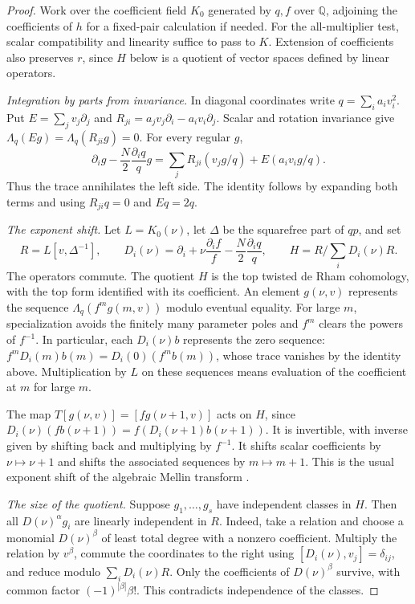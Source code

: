 \documentclass[11pt]{article}
\newcommand{\Lq}{\Lambda_q}
\begin{document}
\begin{proof}
Work over the coefficient field \(K_0\) generated by \(q,f\) over
\(\mathbb Q\), adjoining the coefficients of \(h\) for a fixed-pair
calculation if needed. For the all-multiplier test, scalar compatibility
and linearity suffice to pass to \(K\). Extension of coefficients
also preserves \(r\), since \(H\) below is a quotient of vector spaces
defined by linear operators.

\emph{Integration by parts from invariance.}
In diagonal coordinates write \(q=\sum_i a_i v_i^2\).
Put \(E=\sum_j v_j\partial_j\) and
\(R_{ji}=a_jv_j\partial_i-a_iv_i\partial_j\).
Scalar and rotation invariance give \(\Lq(Eg)=\Lq(R_{ji}g)=0\).
For every regular \(g\),
\[
 \partial_i g-\frac N2\frac{\partial_i q}{q}g
    =\sum_j R_{ji}(v_jg/q)+E(a_i v_i g/q).
\]
Thus the trace annihilates the left side. The identity follows by
expanding both terms and using \(R_{ji}q=0\) and \(E q=2q\).

\emph{The exponent shift.}
Let \(L=K_0(\nu)\), let \(\Delta\) be the squarefree part of \(qp\), and set
\[
 R=L[v,\Delta^{-1}],\qquad
 D_i(\nu)=\partial_i+\nu\frac{\partial_i f}{f}
                         -\frac N2\frac{\partial_i q}{q},
 \qquad H=R\big/\sum_i D_i(\nu)R .
\]
The operators commute. The quotient \(H\) is the top twisted de Rham
cohomology, with the top form identified with its coefficient.
An element \(g(\nu,v)\) represents the sequence
\(\Lq(f^m g(m,v))\) modulo eventual equality. For large \(m\),
specialization avoids the finitely many parameter poles and \(f^m\)
clears the powers of \(f^{-1}\).
In particular, each \(D_i(\nu)b\) represents the zero sequence:
\(f^mD_i(m)b(m)=D_i(0)(f^m b(m))\), whose trace vanishes by the
identity above. Multiplication by \(L\) on these sequences means
evaluation of the coefficient at \(m\) for large \(m\).

The map \(T[g(\nu,v)]=[f g(\nu+1,v)]\) acts on \(H\), since
\(D_i(\nu)(f b(\nu+1))=f(D_i(\nu+1)b(\nu+1))\).
It is invertible, with inverse given by shifting back and multiplying
by \(f^{-1}\). It shifts scalar coefficients by \(\nu\mapsto\nu+1\)
and shifts the associated sequences by \(m\mapsto m+1\).
This is the usual exponent shift of the algebraic Mellin transform
\cite[\S1]{LS}.

\emph{The size of the quotient.}
Suppose \(g_1,\ldots,g_s\) have independent classes in \(H\). Then all
\(D(\nu)^\alpha g_i\) are linearly independent in \(R\).
Indeed, take a relation and choose a monomial \(D(\nu)^\beta\) of
least total degree with a nonzero coefficient. Multiply the relation
by \(v^\beta\), commute the coordinates to the right using
\([D_i(\nu),v_j]=\delta_{ij}\), and reduce modulo \(\sum_iD_i(\nu)R\).
Only the coefficients of \(D(\nu)^\beta\) survive, with common factor
\((-1)^{|\beta|}\beta!\). This contradicts independence of the classes.


\end{proof}
\end{document}
